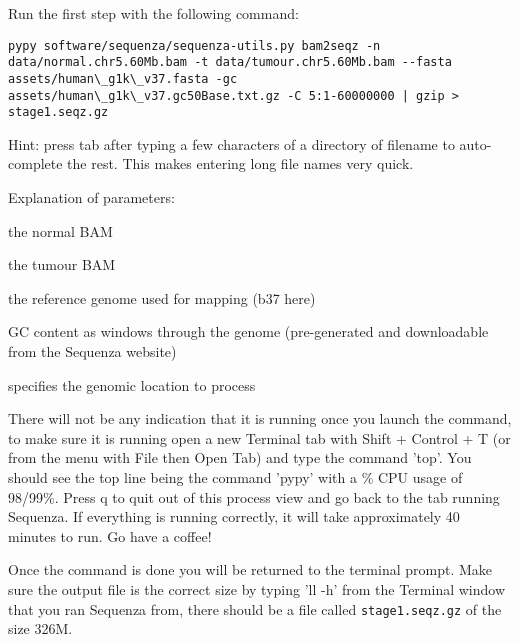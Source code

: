 \begin{steps}
Run the first step with the following command:
\begin{lstlisting}
pypy software/sequenza/sequenza-utils.py bam2seqz -n data/normal.chr5.60Mb.bam -t data/tumour.chr5.60Mb.bam --fasta assets/human\_g1k\_v37.fasta -gc assets/human\_g1k\_v37.gc50Base.txt.gz -C 5:1-60000000 | gzip > stage1.seqz.gz
\end{lstlisting}
\end{steps}

Hint: press tab after typing a few characters of a directory of filename to auto-complete the rest. This makes entering long file names very quick.

\newpage

Explanation of parameters:
\begin{note}
\begin{description}[style=multiline,labelindent=0cm,align=right,leftmargin=\descriptionlabelspace,rightmargin=1.5cm,font=\ttfamily]
 \item[-n] the normal BAM
 \item[-t] the tumour BAM
 \item[--fasta] the reference genome used for mapping (b37 here)
 \item[-gc] GC content as windows through the genome (pre-generated and downloadable from the Sequenza website)
 \item[-C] specifies the genomic location to process
\end{description}
\end{note}

\begin{warning}
There will not be any indication that it is running once you launch the command, to make sure it is running open a new Terminal tab with Shift + Control + T (or from the menu with File then Open Tab) and type the command 'top'. You should see the top line being the command 'pypy' with a \% CPU usage of 98/99\%. Press q to quit out of this process view and go back to the tab running Sequenza. If everything is running correctly, it will take approximately 40 minutes to run. Go have a coffee!
\end{warning}

Once the command is done you will be returned to the terminal prompt. Make sure the output file is the correct size by typing 'll -h' from the Terminal window that you ran Sequenza from, there should be a file called \texttt{stage1.seqz.gz} of the size 326M.\\


